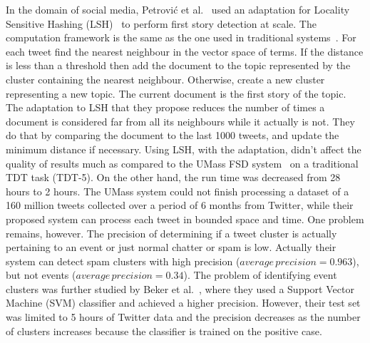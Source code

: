 \documentclass[letterpaper,12pt,titlepage,oneside,final]{book}
\begin{document}
In the domain of social media, Petrovi\'{c} et al.~\cite{petrovic2010streaming}
used an adaptation for Locality Sensitive Hashing (LSH)~\cite{indyk1998approximate} to
perform first story detection at scale. 
The computation framework is the same as the one
used in traditional systems~\cite{yang1998study,allan2000detections}.
For each tweet find the nearest neighbour in the vector space of terms. 
If the distance is less than a threshold then add the document to the topic represented by the cluster containing the nearest neighbour.
Otherwise, create a new cluster representing a new topic. 
The current document is the first story of the topic.
The adaptation to LSH that they propose reduces 
the number of times a document is considered far
from all its neighbours while it actually is not.
They do that by comparing the document to 
the last 1000 tweets, and update the minimum distance if necessary.
Using LSH, with the adaptation, didn't affect the quality of results much 
as compared to the UMass FSD system~\cite{allan2000detections}
on a traditional TDT task (TDT-5).
On the other hand, the run time was decreased from 28 hours to 2 hours.
The UMass system could not finish processing a dataset 
of a 160 million tweets
collected over a period of 6 months from Twitter,
while their proposed system can process each
tweet in bounded space and time.
One problem remains, however.
The precision of determining if a tweet cluster
is actually pertaining to an event or just normal chatter
or spam is low. 
Actually their system can detect spam clusters
with high precision ($average\,precision=0.963$), but not events ($average\,precision=0.34$).
The problem of identifying event clusters was further studied by Beker et al.~\cite{becker2011beyond},
where they used a Support Vector Machine (SVM) classifier and achieved a higher precision.
However, their test set was limited to 5 hours of Twitter data and the precision decreases as 
the number of clusters increases because the classifier is trained on the positive case.
\end{document}
